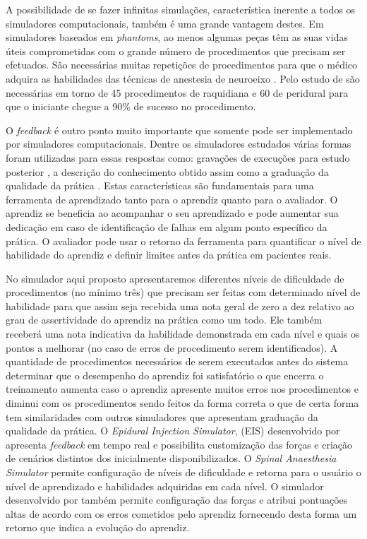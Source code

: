 A possibilidade de se fazer infinitas simulações, característica inerente a todos os simuladores computacionais, também é uma grande vantagem destes. Em simuladores baseados em \textit{phantoms}, ao menos algumas peças têm as suas vidas úteis comprometidas com o grande número de procedimentos que precisam ser efetuados. São necessárias muitas repetições de procedimentos para que o médico adquira as habilidades das técnicas de anestesia de neuroeixo \cite{Konrad1998}. Pelo estudo de \textcite{Kopacz1996} são necessárias em torno de 45 procedimentos de raquidiana e 60 de peridural para que o iniciante chegue a 90\% de sucesso no procedimento.

O \textit{feedback} é outro ponto muito importante que somente pode ser implementado por simuladores computacionais. Dentre os simuladores estudados várias formas foram utilizadas para essas respostas como: gravações de execuções para estudo posterior \cite{Farber2009, Frazzetto2011}, a descrição do conhecimento obtido assim como a graduação da qualidade da prática \cite{Wilson2003, Albert2007, Dreifaldt2006, Brazil2017}. Estas características são fundamentais para uma ferramenta de aprendizado tanto para o aprendiz quanto para o avaliador. O aprendiz se beneficia ao acompanhar o seu aprendizado e pode aumentar sua dedicação em caso de identificação de falhas em algum ponto específico da prática. O avaliador pode usar o retorno da ferramenta para quantificar o nível de habilidade do aprendiz e definir limites antes da prática em pacientes reais. 

No simulador aqui proposto apresentaremos diferentes níveis de dificuldade de procedimentos (no mínimo três) que precisam ser feitas com determinado nível de habilidade para que assim seja recebida uma nota geral de zero a dez relativo ao grau de assertividade do aprendiz na prática como um todo. Ele também receberá uma nota indicativa da habilidade demonstrada em cada nível e quais os pontos a melhorar (no caso de erros de procedimento serem identificados). A quantidade de procedimentos necessários de serem executados antes do sistema determinar que o desempenho do aprendiz foi satisfatório o que encerra o treinamento aumenta caso o aprendiz apresente muitos erros nos procedimentos e diminui com os procedimentos sendo feitos da forma correta o que de certa forma tem similaridades com outros simuladores que apresentam graduação da qualidade da prática. O \textit{Epidural Injection Simulator}, (EIS) desenvolvido por \textcite{Wilson2003} apresenta \textit{feedback} em tempo real e possibilita customização das forças e criação de cenários distintos dos inicialmente disponibilizados. O \textit{Spinal Anaesthesia Simulator} \cite{Albert2007,Dreifaldt2006} permite configuração de níveis de dificuldade e retorna para o usuário o nível de aprendizado e habilidades adquiridas em cada nível. O simulador desenvolvido por \textcite{Brazil2017} também permite configuração das forças e atribui pontuações altas de acordo com os erros cometidos pelo aprendiz fornecendo desta forma um retorno que indica a evolução do aprendiz. 

